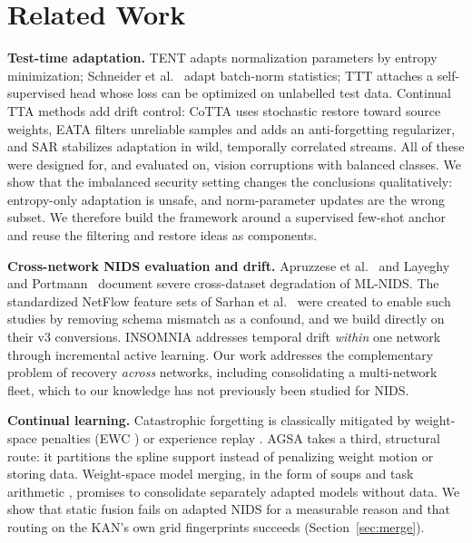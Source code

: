\documentclass[10pt, conference, letterpaper]{IEEEtran}
\begin{document}
\section{Related Work}\label{sec:related}
\textbf{Test-time adaptation.} TENT \cite{wang2021tent} adapts
normalization parameters by entropy minimization;
Schneider et al.~\cite{schneider2020bn} adapt batch-norm statistics; TTT
\cite{sun2020ttt} attaches a self-supervised head whose loss can be
optimized on unlabelled test data. Continual TTA methods add drift
control: CoTTA \cite{wang2022cotta} uses stochastic restore toward
source weights, EATA \cite{niu2022eata} filters unreliable samples and
adds an anti-forgetting regularizer, and SAR \cite{niu2023sar}
stabilizes adaptation in wild, temporally correlated streams. All of
these were designed for, and evaluated on, vision corruptions with
balanced classes. We show that the imbalanced security setting changes
the conclusions qualitatively: entropy-only adaptation is unsafe, and
norm-parameter updates are the wrong subset. We therefore build the
framework around a supervised few-shot anchor and reuse the filtering
and restore ideas as components.

\textbf{Cross-network NIDS evaluation and drift.} Apruzzese et
al.~\cite{apruzzese2022cross} and Layeghy and
Portmann~\cite{layeghy2023generalisability} document severe
cross-dataset degradation of ML-NIDS. The standardized NetFlow feature
sets of Sarhan et al.~\cite{sarhan2022netflow} were created to enable
such studies by removing schema mismatch as a confound, and we build
directly on their v3 conversions. INSOMNIA
\cite{andresini2021insomnia} addresses temporal drift \emph{within} one
network through incremental active learning. Our work addresses the
complementary problem of recovery \emph{across} networks, including
consolidating a multi-network fleet, which to our knowledge has not
previously been studied for NIDS.

\textbf{Continual learning.} Catastrophic forgetting
\cite{mccloskey1989catastrophic} is classically mitigated by
weight-space penalties (EWC \cite{kirkpatrick2017ewc}) or experience
replay \cite{rolnick2019replay}. AGSA takes a third, structural route:
it partitions the spline support instead of penalizing weight motion or
storing data. Weight-space model merging, in the form of soups
\cite{wortsman2022soups} and task arithmetic \cite{ilharco2023task},
promises to consolidate separately adapted models without data. We show
that static fusion fails on adapted NIDS for a measurable reason and
that routing on the KAN's own grid fingerprints succeeds
(Section~\ref{sec:merge}).
\end{document}
